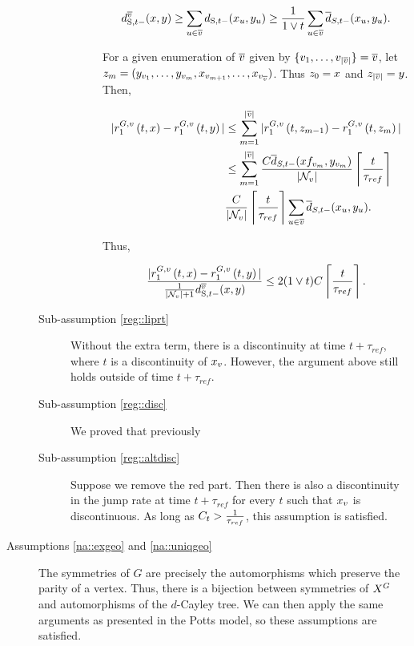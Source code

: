 \begin{description}
\begin{description}
\begin{description}
\[\stmet{t-}^{\cl{v}}(\xf,\xg) \geq \sum_{u \in \cl{v}} \stmet{t-}(\xf\vind{u},\xg\vind{u}) \geq \frac{1}{1\vee t}\sum_{u \in \cl{v}} \ov{d}_{S,t-}(\xf\vind{u},\xg\vind{u}).\]

For a given enumeration of \(\overline{v}\) given by \(\{v_1,\dots,v_{|\overline{v}|}\} = \overline{v}\), let \(z_m = (y_{v_1},\dots,y_{v_m},x_{v_{m+1}},\dots,x_{v_{\overline{v}}})\). Thus \(z_0 = x\) and \(z_{|\overline{v}|} = y\). Then,

\begin{align*}
|\rate\gvpara{G}{v}\stpara{1}\tmepro{t}{\xf}{} - \rate\gvpara{G}{v}\stpara{1}\tmepro{t}{\xg}{}| &\leq \sum_{m=1}^{|\cl{v}|}|\rate\gvpara{G}{v}\stpara{1}\tmepro{t}{\xh_{m-1}}{} - \rate\gvpara{G}{v}\stpara{1}\tmepro{t}{\xh_m}{}|\\
&\leq \sum_{m=1}^{|\cl{v}|} \frac{C\ov{d}_{S,t-}(xf\vind{v_m},\xg\vind{v_m})}{|\neigh{v}|}\left\lceil\frac{t}{\tau_{ref}}\right\rceil\\
&\frac{C}{|\neigh{v}|}\left\lceil\frac{t}{\tau_{ref}}\right\rceil\sum_{u\in \cl{v}}\ov{d}_{S,t-}(\xf\vind{u},\xg\vind{u}).
\end{align*}

Thus,

\[\frac{|\rate\gvpara{G}{v}\stpara{1}\tmepro{t}{\xf}{} - \rate\gvpara{G}{v}\stpara{1}\tmepro{t}{\xg}{}|}{\frac{1}{|\neigh{v}|+1}\stmet{t-}^{\cl{v}}(\xf,\xg)} \leq 2(1\vee t)C\left\lceil\frac{t}{\tau_{ref}}\right\rceil.\]

\end{description}


\item[Sub-assumption \ref{reg::liprt}] 

\ind Without the extra term, there is a discontinuity at time \(t +\tau_{ref}\), where \(t\) is a discontinuity of \(x_{v}\). However, the argument above still holds outside of time \(t + \tau_{ref}\).


\item[Sub-assumption \ref{reg::disc}] We proved that previously

\item[Sub-assumption \ref{reg::altdisc}] Suppose we remove the red part. Then there is also a discontinuity in the jump rate at time \(t + \tau_{ref}\) for every \(t\) such that \(x_{v}\) is discontinuous. As long as \(C_{t} > \frac{1}{\tau_{ref}}\), this assumption is satisfied.
\end{description}

\item[Assumptions \ref{na::exgeo} and \ref{na::uniqgeo}] The symmetries of \(G\) are precisely the automorphisms which preserve the parity of a vertex. Thus, there is a bijection between symmetries of \(X^{G}\) and automorphisms of the \(d\)-Cayley tree. We can then apply the same arguments as presented in the Potts model, so these assumptions are satisfied.
\end{description}

